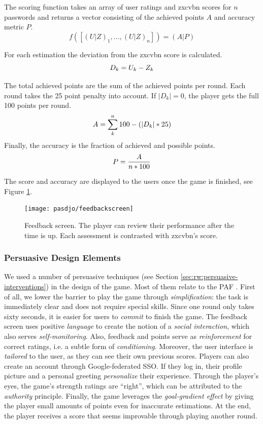 \noindent The scoring function takes an array of user ratings and zxcvbn scores for $n$ passwords and returns a vector consisting of the achieved points $A$ and accuracy metric $P$.
\[
f([(U|Z)_1, ..., (U|Z)_n]) = (A|P)
\]

\noindent For each estimation the deviation from the zxcvbn score is calculated.
\[
D_k = U_k - Z_k\\
\]

\noindent The total achieved points are the sum of the achieved points per round. Each round takes the 25 point penalty into account. If $|D_k|=0$, the player gets the full 100 points per round.
\[
A = \sum_{k}^{n} 100 - (|D_k|*25) \\
\]
\noindent Finally, the accuracy is the fraction of achieved and possible points. 
\[
P = \frac{A}{n * 100}\\
\]

The score and accuracy are displayed to the users once the game is finished, see Figure \ref{fig:pasdjo:feedbackscreen}.

\begin{figure}
	\centering
	\texttt{[image: pasdjo/feedbackscreen]}
	\caption{\label{fig:pasdjo:feedbackscreen}Feedback screen. The player can review their performance after the time is up. Each assessment is contrasted with zxcvbn's score.}
\end{figure}

\subsubsection{Persuasive Design Elements}
We used a number of persuasive techniques (see Section \ref{sec:rw:persuasive-interventions}) in the design of the game. Most of them relate to the \acrlong{PAF} \cite{Forget2007PersuasionEducationSecurity}. First of all, we lower the barrier to play the game through \textit{simplification}: the task is immediately clear and does not require special skills. Since one round only takes sixty seconds, it is easier for users to \textit{commit} to finish the game. The feedback screen uses positive \textit{language} to create the notion of a \textit{social interaction}, which also serves \textit{self-monitoring}. Also, feedback and points serve as \textit{reinforcement} for correct ratings, i.e. a subtle form of \textit{conditioning}. Moreover, the user interface is \textit{tailored} to the user, as they can see their own previous scores. Players can also create an account through Google-federated \gls{SSO}. If they log in, their profile picture and a personal greeting \textit{personalize} their experience. Through the player's eyes, the game's strength ratings are ``right'', which can be attributed to the \textit{authority} principle. Finally, the game leverages the \textit{goal-gradient effect} by giving the player small amounts of points even for inaccurate estimations. At the end, the player receives a score that seems improvable through playing another round. 

